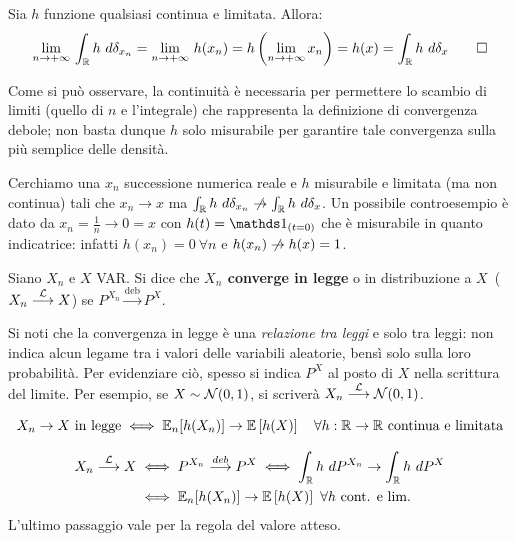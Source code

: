 \begin{dimo}
  Sia $h$ funzione qualsiasi continua e limitata. Allora:
  $$\lim_{n \to +\infty} \, \int_\mathbb R h \ d \delta_{x_n} = \lim_{n \to +\infty} \,  h(x_n) = h\left(\lim_{n \to +\infty} x_n\right) = h(x) = \int_\mathbb R h \ d \delta_x \qedhere$$
\end{dimo}

Come si può osservare, la continuità è necessaria per permettere lo scambio di limiti (quello di $n$ e l'integrale) che rappresenta la definizione di convergenza debole; non basta dunque $h$ solo misurabile per garantire tale convergenza sulla più semplice delle densità.

\smallskip
\begin{cese}
  Cerchiamo una $x_n$ successione numerica reale e $h$ misurabile e limitata (ma non continua) tali che $x_n \to x$ ma $\int_\RR h \ d \delta_{x_n} \centernot\to \int_\RR h \ d \delta_x$.
  Un possibile controesempio è dato da $x_n = \frac 1 n\to 0 = x$ con $h(t) = \Ind_{ (t = 0) }$ che è misurabile in quanto indicatrice: infatti $h(x_n) = 0 \ \forall n$ e $h(x_n) \centernot\to h(x) = 1$.
\end{cese}

\medskip
\begin{defn}
  Siano $X_n$ e $X$ VAR. Si dice che \textbf{$X_n$ converge in legge} o in distribuzione a $X \, $  ($X_n \stackrel{\mathcal L}{\longrightarrow} X$) se $P^{X_n}\xrightarrow{\text{deb}} P^X$.
\end{defn}

Si noti che la convergenza in legge è una \emph{relazione tra leggi} e solo tra leggi: non indica alcun legame tra i valori delle variabili aleatorie, bensì solo sulla loro probabilità.
Per evidenziare ciò, spesso si indica $P^X$ al posto di $X$ nella scrittura del limite.
Per esempio, se $X \sim \mathcal N(0,1)$, si scriverà $X_n \stackrel{\mathcal L}{\longrightarrow} \mathcal N(0,1) $.

\medskip
\begin{teob}[\JPTh{18.1}]
  $$X_n\to X \text{ in legge} \iff \mathbb E_n[h(X_n)]\to \mathbb E \left[ h(X) \right] \quad \forall h:\mathbb R\to \mathbb R \text{ continua e limitata}$$
\end{teob}

\begin{dimo}
  \Fixvmode
  \begin{align*}
    X_n \stackrel{\mathcal L}{\longrightarrow} X
    & \iff P^{X_n} \stackrel{deb}{\longrightarrow} P^X
    \iff \int_\mathbb R h \ dP^{X_n}\to \int_\mathbb R h \ dP^{X}\\
    & \iff \mathbb E_n[h(X_n)]\to \mathbb E \left[ h(X) \right] \ \forall h \text{ cont. e lim.}
  \end{align*}
  L'ultimo passaggio vale per la regola del valore atteso.
\end{dimo}


